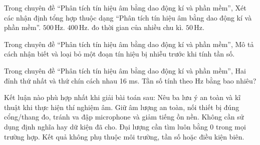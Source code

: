 \begin{ex}
Trong chuyên đề “Phân tích tín hiệu âm bằng dao động kí và phần mềm”, Xét các nhận định tổng hợp thuộc dạng “Phân tích tín hiệu âm bằng dao động kí và phần mềm”.
\choiceTF
{\True $500\,\text{Hz}$.}
{\True $400\,\text{Hz}$.}
{\True đo thời gian của nhiều chu kì.}
{$50\,\text{Hz}$.}
\end{ex}

\begin{ex}
Trong chuyên đề “Phân tích tín hiệu âm bằng dao động kí và phần mềm”, Mô tả cách nhận biết và loại bỏ một đoạn tín hiệu bị nhiễu trước khi tính tần số.
\choiceTF

\end{ex}

\begin{ex}
Trong chuyên đề “Phân tích tín hiệu âm bằng dao động kí và phần mềm”, Hai đỉnh thứ nhất và thứ chín cách nhau 16 ms. Tần số tính theo Hz bằng bao nhiêu?
\end{ex}

\begin{ex}
Kết luận nào phù hợp nhất khi giải bài toán sau: Nêu ba lưu ý an toàn và kĩ thuật khi thực hiện thí nghiệm âm.
\choice
{\True Giữ âm lượng an toàn, nối thiết bị đúng cổng/thang đo, tránh va đập microphone và giảm tiếng ồn nền.}
{Không cần sử dụng định nghĩa hay dữ kiện đã cho.}
{Đại lượng cần tìm luôn bằng 0 trong mọi trường hợp.}
{Kết quả không phụ thuộc môi trường, tần số hoặc điều kiện biên.}
\end{ex}

